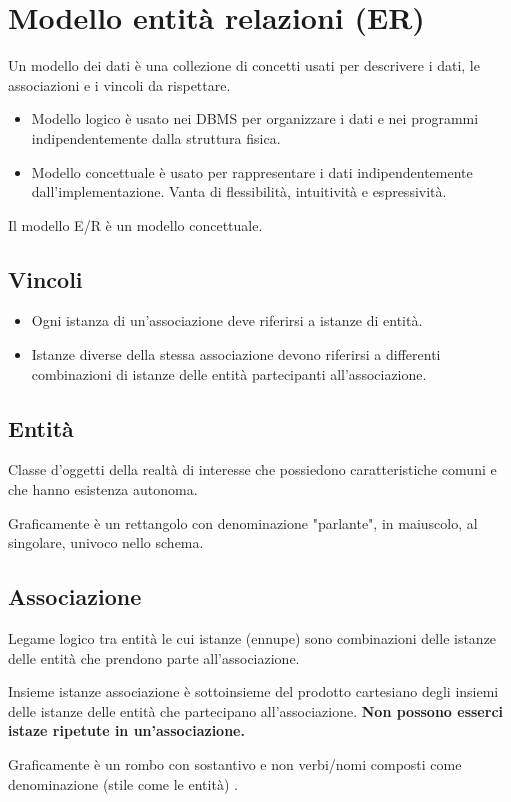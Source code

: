 \section{Modello entità relazioni (ER)}
Un modello dei dati è una collezione di concetti usati per descrivere i dati, le associazioni e i vincoli da rispettare.
\begin{itemize}
	\item Modello logico è usato nei DBMS per organizzare i dati e nei programmi indipendentemente dalla struttura fisica.
	\item Modello concettuale è usato per rappresentare i dati indipendentemente dall'implementazione.
	Vanta di flessibilità, intuitività e espressività.
\end{itemize}
Il modello E/R è un modello concettuale.
\subsection{Vincoli}
\begin{itemize}
	\item Ogni istanza di un'associazione deve riferirsi a istanze di entità.
	\item Istanze diverse della stessa associazione devono riferirsi a differenti combinazioni di istanze delle entità partecipanti all'associazione.
\end{itemize}
\subsection{Entità}
Classe d'oggetti della realtà di interesse che possiedono caratteristiche comuni e che hanno esistenza autonoma.

Graficamente è un rettangolo con denominazione "parlante", in maiuscolo, al singolare, univoco nello schema.

\subsection{Associazione}
Legame logico tra entità le cui istanze (ennupe) sono combinazioni delle istanze delle entità che prendono parte all'associazione.

Insieme istanze associazione è sottoinsieme del prodotto cartesiano degli insiemi delle istanze delle entità che partecipano all'associazione. \textbf{Non possono esserci istaze ripetute in un'associazione.}

Graficamente è un rombo con sostantivo e non verbi/nomi composti come denominazione (stile come le entità) .

